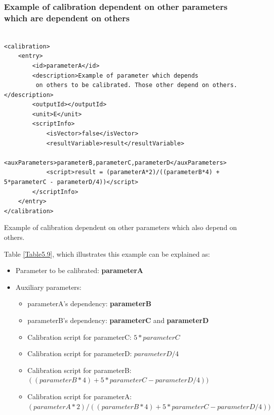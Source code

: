 \subsubsection{Example of calibration dependent on other parameters which are dependent on others}




 \begin{table}[H]
\lstset{language=XML}
\begin{lstlisting}

<calibration>
	<entry>
		<id>parameterA</id>
		<description>Example of parameter which depends
		 on others to be calibrated. Those other depend on others.</description>
		<outputId></outputId>
		<unit>E</unit>
		<scriptInfo>
			<isVector>false</isVector>
			<resultVariable>result</resultVariable>
			<auxParameters>parameterB,parameterC,parameterD</auxParameters>
			<script>result = (parameterA*2)/((parameterB*4) + 5*parameterC - parameterD/4))</script>
		</scriptInfo>
	</entry>
</calibration>
\end{lstlisting}
\caption{Example of calibration dependent on other parameters which also depend on others.} 
\label{Table5.9}
\end{table}

Table \ref{Table5.9}, which illustrates this example can be explained as:
\begin{itemize}
\item Parameter to be calibrated: \textbf{parameterA}
\item Auxiliary parameters:
	\begin{itemize}
		\item parameterA's dependency: \textbf{parameterB}
		\item parameterB's dependency: \textbf{parameterC} and \textbf{parameterD}
		\item Calibration script for parameterC: $5*parameterC$
		\item Calibration script for parameterD: $parameterD/4$
		\item Calibration script for parameterB: $((parameterB*4) + 5*parameterC - parameterD/4))$
		\item Calibration script for parameterA: $(parameterA*2)/((parameterB*4) + 5*parameterC - parameterD/4))$
	\end{itemize}
\end{itemize}



